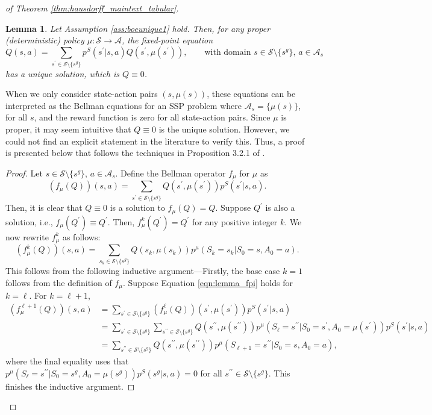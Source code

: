 \documentclass{amsart}
\newtheorem{lemma}{Lemma}
\begin{document}
\begin{proof}[of Theorem \ref{thm:hausdorff_maintext_tabular}]
\begin{lemma}\label{lem:bellmanfirstpart}
    Let Assumption \ref{ass:boeunique1} hold.
    Then, for any proper (deterministic) policy $\mu:\mathcal{S} \rightarrow \mathcal{A}$, the fixed-point equation
    $$Q(s,a)=\sum_{s^\prime \in \mathcal{S}\setminus \{s^g\}} p^S(s^\prime|s,a) Q(s^\prime,\mu(s^\prime)), \qquad \text{with domain }s \in \mathcal{S} \setminus \{s^g\},\,a \in \mathcal{A}_s$$
    has a unique solution, which is $Q \equiv 0$.
\end{lemma}
When we only consider state-action pairs $(s,\mu(s))$, these equations can be interpreted as the Bellman equations for an SSP problem where $\mathcal{A}_s=\{\mu(s)\}$, for all $s$, and the reward function is zero for all state-action pairs. Since $\mu$ is proper, it may seem intuitive that $Q \equiv 0$ is the unique solution. However, we could not find an explicit statement in the literature to verify this. Thus, a proof is presented below that follows the techniques in Proposition 3.2.1 of \citet{bertsekas2012}.
\begin{proof}
Let $s \in \mathcal{S} \setminus \{s^g\},\,a \in \mathcal{A}_s$. Define the Bellman operator $f_\mu$ for $\mu$ as
$$(f_\mu(Q))(s,a)=\sum_{s^\prime \in \mathcal{S} \setminus \{s^g\}} Q(s^\prime,\mu(s^\prime)) p^S(s^\prime|s,a).$$
Then, it is clear that $Q \equiv 0$ is a solution to $f_\mu(Q)=Q$. Suppose $Q^\prime$ is also a solution, i.e., $f_\mu(Q^\prime)\equiv Q^\prime$. Then, $f_\mu^k(Q^\prime)=Q^\prime$ for any positive integer $k$. We now rewrite $f^k_\mu$ as follows:
    \begin{equation} (f_\mu^k(Q))(s,a) = \sum_{s_k \in \mathcal{S}\setminus \{s^g\}} Q(s_k,\mu(s_k)) p^\mu(S_k=s_k|S_0=s,A_0=a). \label{eqn:lemma_fpi}
    \end{equation}
This follows from the following inductive argument---Firstly, the base case $k=1$ follows from the definition of $f_\mu$. Suppose Equation \ref{eqn:lemma_fpi} holds for $k=\ell$. For $k=\ell+1$,
\begin{align*}
(f^{\ell+1}_\mu(Q))(s,a) &= \sum_{s^\prime \in \mathcal{S} \setminus \{s^g\}} (f_\mu^{\ell}(Q))(s^\prime,\mu(s^\prime))p^S(s^\prime|s,a) \\
&=  \sum_{s^\prime \in \mathcal{S} \setminus \{s^g\}} \sum_{s^{\prime\prime} \in \mathcal{S} \setminus \{s^g\}} Q(s^{\prime\prime},\mu(s^{\prime\prime})) p^\mu(S_\ell=s^{\prime\prime}|S_0=s^\prime,A_0=\mu(s^\prime)) p^S(s^\prime|s,a)\\
&= \sum_{s^{\prime\prime} \in \mathcal{S} \setminus \{s^g\}} Q(s^{\prime\prime},\mu(s^{\prime\prime})) p^\mu (S_{\ell+1}=s^{\prime\prime}|S_0=s,A_0=a),
\end{align*}
where the final equality uses that $p^\mu(S_\ell=s^{\prime\prime}|S_0=s^g, A_0=\mu(s^g)) p^S(s^g|s,a)=0$ for all $s^{\prime \prime} \in \mathcal{S} \setminus \{s^g\}$. This finishes the inductive argument.


\end{proof}
\end{proof}
\end{document}
